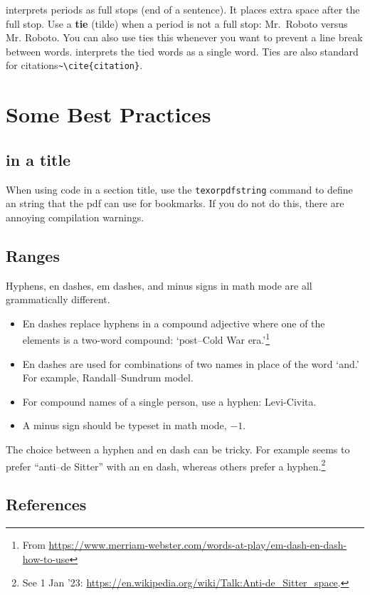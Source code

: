 \LaTeXx interprets periods as full stops (end of a sentence). It places extra space after the full stop. Use a \textbf{tie} (tilde) when a period is not a full stop: Mr.~Roboto versus Mr. Roboto. 
% 
You can also use ties this whenever you want to prevent a line break between words. \LaTeXx interprets the tied words as a single word.
% 
Ties are also standard for citations\verb!~\cite{citation}!.



\section{Some Best Practices}

\subsection{\texorpdfstring{\LaTeXx in a title}{LaTeX in a title}}

When using \LaTeXx code in a section title, use the \texttt{texorpdfstring} command to define an  string that the pdf can use for bookmarks. If you do not do this, there are annoying compilation warnings.


\subsection{Ranges}

Hyphens, en dashes, em dashes, and minus signs in math mode are all grammatically different.
\begin{itemize}
	\item En dashes replace hyphens in a compound adjective where one of the elements is a two-word compound: `post--Cold War era.'\footnote{From \url{https://www.merriam-webster.com/words-at-play/em-dash-en-dash-how-to-use}}
	\item En dashes are used for combinations of two names in place of the word `and.' For example, Randall--Sundrum model.
	\item For compound names of a single person, use a hyphen: Levi-Civita.
	\item A minus sign should be typeset in math mode, $-1$.
\end{itemize}
The choice between a hyphen and en dash can be tricky. For example  seems to prefer ``anti--de Sitter'' with an en dash, whereas others prefer a hyphen.\footnote{See 1 Jan '23: \url{https://en.wikipedia.org/wiki/Talk:Anti-de_Sitter_space}.}


\subsection{References}

